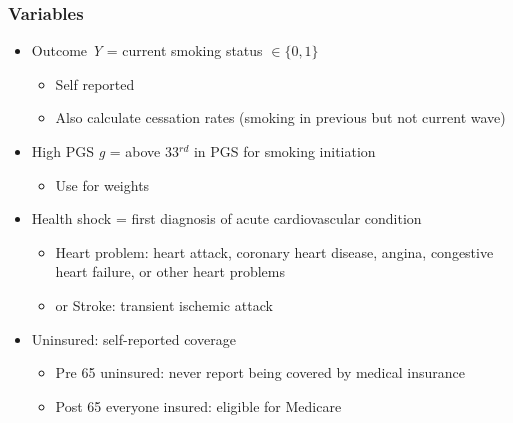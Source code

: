 \documentclass[10pt,compress,xcolor=dvipsnames]{beamer}    %
\newcounter{ex}
\newcommand{\1}[1]{\mathrm{1\hspace*{-2.5pt}l}[#1]}	%
\begin{document}
\begin{frame}\frametitle{Variables}\label{frame:vars}

\begin{itemize}
	\item Outcome \textit{\color{Verde} Y} = current smoking status $\in \{0,1\}$
	\begin{itemize}
		\item Self reported
		\item Also calculate cessation rates (smoking in previous but not current wave)
	\end{itemize}

	\smallskip

	\item High PGS \textit{\color{Verde} g} = above 33$^{rd}$ in PGS for smoking initiation
	\begin{itemize}
		\item Use \cite{GSCAN2019gwas} for weights
	\end{itemize}

	\smallskip

	\item Health {\color{Verde} shock} = first diagnosis of acute cardiovascular condition
	\begin{itemize}
		\item Heart problem: heart attack, coronary heart disease, angina, congestive heart
failure, or other heart problems
		\item or Stroke: transient ischemic attack
	\end{itemize}

	\smallskip

	\item {\color{Verde} Uninsured}: self-reported coverage
	\begin{itemize}
		\item Pre 65 uninsured: never report being covered by medical insurance
		\item Post 65 everyone insured: eligible for Medicare
	\end{itemize}
\end{itemize}

\end{frame}
\end{document}
